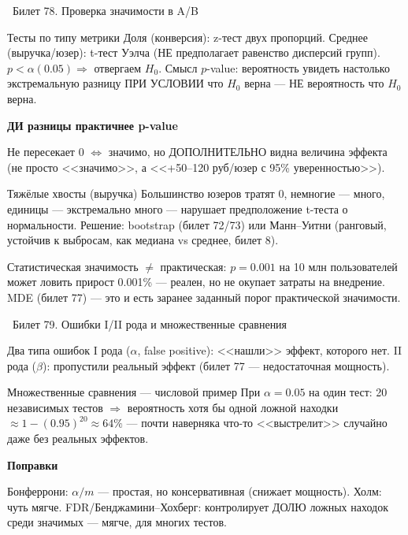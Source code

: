 \documentclass[12pt, a4paper]{article}
\newcommand{\bilet}[2]{%
  \vspace{10pt}%
  \noindent\colorbox{qcolor}{\parbox{\dimexpr\linewidth-2\fboxsep\relax}{%
    \color{white}\large\bfseries\strut\ Билет #1. #2%
  }}%
  \nopagebreak\vspace{5pt}\par\nopagebreak%
}
\newcommand{\qsub}[1]{%
  \vspace{5pt}%
  {\bfseries\color{defblue} #1}%
  \par\vspace{2pt}%
}
\begin{document}
\bilet{78}{Проверка значимости в A/B}

\begin{defbox}{Тесты по типу метрики}
Доля (конверсия): z-тест двух пропорций. Среднее (выручка/юзер): t-тест Уэлча (НЕ предполагает равенство дисперсий групп). $p<\alpha(0.05)\Rightarrow$ отвергаем $H_0$. Смысл $p$-value: вероятность увидеть настолько экстремальную разницу ПРИ УСЛОВИИ что $H_0$ верна --- НЕ вероятность что $H_0$ верна.
\end{defbox}

\qsub{ДИ разницы практичнее p-value}
Не пересекает 0 $\Leftrightarrow$ значимо, но ДОПОЛНИТЕЛЬНО видна величина эффекта (не просто <<значимо>>, а <<+50--120 руб/юзер с 95\% уверенностью>>).

\begin{propbox}{Тяжёлые хвосты (выручка)}
Большинство юзеров тратят 0, немногие --- много, единицы --- экстремально много --- нарушает предположение t-теста о нормальности. Решение: bootstrap (билет 72/73) или Манн--Уитни (ранговый, устойчив к выбросам, как медиана vs среднее, билет 8).
\end{propbox}

\begin{fishkabox}
Статистическая значимость $\ne$ практическая: $p{=}0.001$ на 10 млн пользователей может ловить прирост 0.001\% --- реален, но не окупает затраты на внедрение. MDE (билет 77) --- это и есть заранее заданный порог практической значимости.
\end{fishkabox}

\bilet{79}{Ошибки I/II рода и множественные сравнения}

\begin{defbox}{Два типа ошибок}
I рода ($\alpha$, false positive): <<нашли>> эффект, которого нет. II рода ($\beta$): пропустили реальный эффект (билет 77 --- недостаточная мощность).
\end{defbox}

\begin{exbox}{Множественные сравнения --- числовой пример}
При $\alpha{=}0.05$ на один тест: 20 независимых тестов $\Rightarrow$ вероятность хотя бы одной ложной находки $\approx1-(0.95)^{20}\approx64\%$ --- почти наверняка что-то <<выстрелит>> случайно даже без реальных эффектов.
\end{exbox}

\qsub{Поправки}
Бонферрони: $\alpha/m$ --- простая, но консервативная (снижает мощность). Холм: чуть мягче. FDR/Бенджамини--Хохберг: контролирует ДОЛЮ ложных находок среди значимых --- мягче, для многих тестов.
\end{document}
